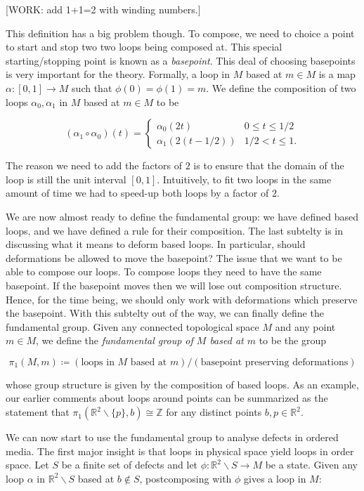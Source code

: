 \documentclass{article}
\theoremstyle{definition}
\newcommand{\RR}{\mathbb{R}}
\newcommand{\ZZ}{\mathbb{Z}}
\newcommand{\0}{\left|0\right>}
\newcommand{\1}{\left|1\right>}
\numberwithin{figure}{section}
\begin{document}
[WORK: add 1+1=2 with winding numbers.]

This definition has a big problem though. To compose, we need to choice a point to start and stop two two loops being composed at. This special starting/stopping point is known as a \textit{basepoint}. This deal of choosing basepoints is very important for the theory. Formally, a loop in $M$ based at $m\in M$ is a map $\alpha:[0,1]\to M$ such that $\phi(0)=\phi(1)=m$. We define the composition of two loops $\alpha_0,\alpha_1$ in $M$ based at $m\in M$ to be

$$
(\alpha_1 \circ \alpha_0)(t)=
\begin{cases}
\alpha_0(2t) & 0\leq t \leq 1/2 \\
\alpha_1(2(t-1/2)) & 1/2 < t \leq 1.
\end{cases}$$

The reason we need to add the factors of $2$ is to ensure that the domain of the loop is still the unit interval $[0,1]$. Intuitively, to fit two loops in the same amount of time we had to speed-up both loops by a factor of 2.

We are now almost ready to define the fundamental group: we have defined based loops, and we have defined a rule for their composition. The last subtelty is in discussing what it means to deform based loops. In particular, should deformations be allowed to move the basepoint? The issue that we want to be able to compose our loops. To compose loops they need to have the same basepoint. If the basepoint moves then we will lose out composition structure. Hence, for the time being, we should only work with deformations which preserve the basepoint. With this subtelty out of the way, we can finally define the fundamental group. Given any connected topological space $M$ and any point $m\in M$, we define the \textit{fundamental group of $M$ based at $m$} to be the group

$$\pi_1(M,m)\coloneqq \left(\text{loops in $M$ based at $m$}\right)/\left(\text{basepoint preserving deformations}\right)$$

whose group structure is given by the composition of based loops. As an example, our earlier comments about loops around points can be summarized as the statement that $\pi_1(\RR^2\backslash\{p\},b)\cong \ZZ$ for any distinct points $b,p\in \RR^2$.

We can now start to use the fundamental group to analyse defects in ordered media. The first major insight is that loops in physical space yield loops in order space. Let $S$ be a finite set of defects and let $\phi: \RR^2 \backslash S \to M$ be a state. Given any loop $\alpha$ in $\RR^2\backslash S$ based at $b\not\in S$, postcomposing with $\phi$ gives a loop in $M$:
\end{document}

